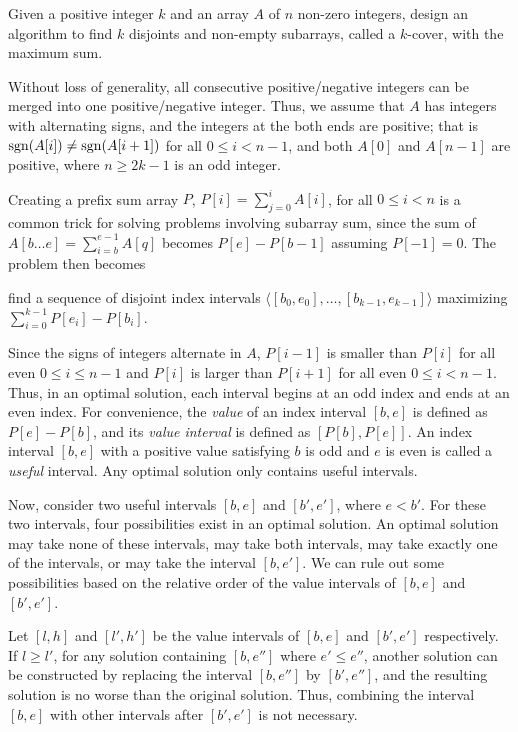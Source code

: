 \begin{Exercise}[title=$k$-covers]
Given a positive integer $k$ and an array $A$ of $n$ non-zero integers, design an algorithm to find $k$ disjoints and non-empty subarrays, called a $k$-cover, with the maximum sum.
\end{Exercise}
\begin{Answer}
Without loss of generality, all consecutive positive/negative integers can be merged into one positive/negative integer. 
Thus, we assume that $A$ has integers with alternating signs, and the integers at the both ends are positive; that is $\operatorname{sgn}(A[i]) \neq \operatorname{sgn}(A[i+1])$ for all $0 \leq i < n - 1$, and both $A[0]$ and $A[n - 1]$ are positive, where $n \geq 2k - 1$ is an odd integer.

Creating a prefix sum array $P$, $P[i] = \sum_{j = 0}^i A[i]$, for all $0 \leq i < n$ is a common trick for solving problems involving subarray sum, since the sum of $A[b\dots e] = \sum_{i = b}^{e - 1} A[q]$ becomes $P[e] - P[b - 1]$ assuming $P[-1] = 0$.
The problem then becomes 
\begin{mdframed}
\centering
find a sequence of disjoint index intervals $\langle [b_0, e_0], \dots, [b_{k-1}, e_{k-1}]\rangle$ maximizing $\sum_{i = 0}^{k - 1} P[e_i] - P[b_i]$.
\end{mdframed}

Since the signs of integers alternate in $A$, $P[i - 1]$ is smaller than  $P[i]$ for all even $0 \leq i \leq n - 1$ and $P[i]$ is larger than  $P[i + 1]$ for all even $0 \leq i < n - 1$.
Thus, in an optimal solution, each interval begins at an odd index and ends at an even index.
For convenience, the \emph{value} of an index interval $[b, e]$ is defined as $P[e] - P[b]$, and its \emph{value interval} is defined as $[P[b], P[e]]$.
An index interval $[b, e]$ with a positive value satisfying $b$ is odd and $e$ is even is called a \emph{useful} interval.
Any optimal solution only contains useful intervals.

Now, consider two useful intervals $[b, e]$ and $[b', e']$, where $e < b'$.
For these two intervals, four possibilities exist in an optimal solution.
An optimal solution may take none of these intervals, may take both intervals, may take exactly one of the intervals, or may take the interval $[b, e']$.
We can rule out some possibilities based on the relative order of the value intervals of $[b, e]$ and $[b', e']$.

Let $[l, h]$ and $[l', h']$ be the value intervals of $[b, e]$ and $[b', e']$ respectively.
If $l \geq l'$, for any solution containing $[b, e'']$ where $e' \leq e''$, another solution can be constructed by replacing the interval $[b, e'']$ by $[b', e'']$, and the resulting solution is no worse than the original solution. 
Thus, combining the interval $[b, e]$ with other intervals after $[b', e']$ is not necessary.


\end{Answer}
